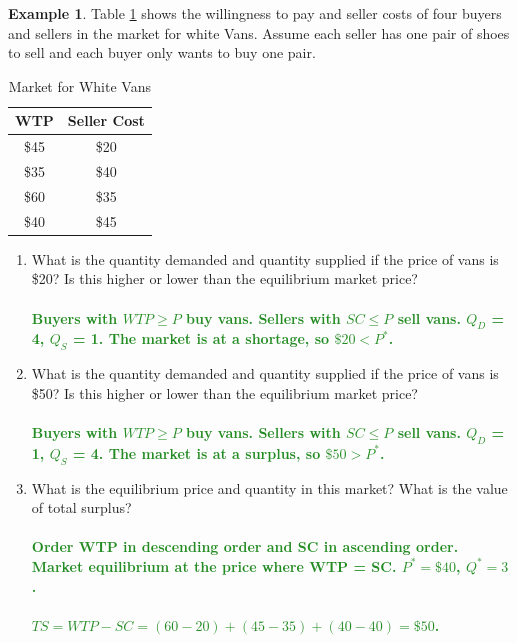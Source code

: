 \documentclass[11pt]{article}\usepackage[]{graphicx}\usepackage[]{color}
\theoremstyle{definition}
\newtheorem{exmp}{Example}[section]
\newcommand{\blank}[1]{}
\newcommand{\ddp}[1]{{\textbf{\textcolor{ForestGreen}{#1}}}}
\begin{document}
		\begin{exmp} 
			
			Table \ref{blahblah} shows the willingness to pay and seller costs of four buyers and sellers in the market for white Vans. Assume each seller has one pair of shoes to sell and each buyer only wants to buy one pair.
			\begin{table}[ht]
				\caption{Market for White Vans}
				\label{blahblah}
				\centering
				\begin{tabular}{ c|c}        
					
					WTP   & Seller Cost \\
					\hline
					\$45 & \$20 \\
					\$35 & \$40 \\
					\$60 & \$35 \\
					\$40 & \$45 \\
				\end{tabular}
			\end{table}
			
		\begin{enumerate}
	\item	What is the quantity demanded and quantity supplied if the price of vans is \$20? Is this higher or lower than the equilibrium market price? 
		\ddp{\\\\  Buyers with $WTP \ge P$ buy vans. Sellers with $SC \le P$ sell vans. $Q_D$ = 4, $Q_S$ = 1. The market is at a shortage, so $\$20<P^*$.} 
	\blank{}
	\item	What is the quantity demanded and quantity supplied if the price of vans is \$50? Is this higher or lower than the equilibrium market price?
		\ddp{\\\\ Buyers with $WTP \ge P$ buy vans. Sellers with $SC \le P$ sell vans. $Q_D$ = 1, $Q_S$ = 4. The market is at a surplus, so $\$50>P^*$.} 
	\blank{}	
	\item	What is the equilibrium price and quantity in this market? What is the value of total surplus?
		\ddp{\\\\ Order WTP in descending order and SC in ascending order. Market equilibrium at the price where WTP = SC. $P^* = \$40$, $Q^* = 3$.
			\\
			\\
			$TS = WTP - SC = (60 - 20) + (45 - 35) + (40 - 40) = \$50$.}
	\blank{}
\end{enumerate}	
\blank{}	
		\end{exmp}
\end{document}
